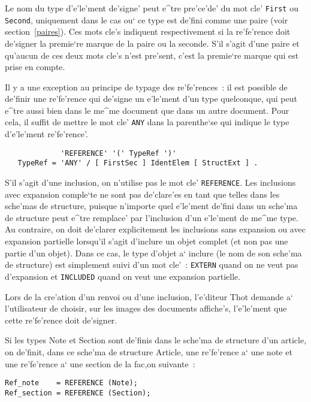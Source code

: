 {Le nom du type d'e'le'ment de'signe' peut e^tre pre'ce'de' du mot cle'
{\tt First} ou {\tt Second}, uniquement dans le cas ou` ce type est de'fini
comme une paire (voir section~\ref{paires}). Ces mots cle's indiquent
respectivement si la re'fe'rence doit de'signer la premie`re marque de la paire
ou la seconde. S'il s'agit d'une paire et qu'aucun de ces deux mots cle's
n'est pre'sent, c'est la premie`re marque qui est prise en compte.

Il y a une exception au principe de typage des re'fe'rences~: il est possible
de de'finir une re'fe'rence qui de'signe un e'le'ment d'un type quelconque,
qui peut e^tre aussi bien dans le me^me document que dans un autre document.
Pour cela, il suffit de mettre le mot cle' {\tt ANY} dans la parenthe`se
qui indique le type d'e'le'ment re'fe'rence'.

\begin{verbatim}
             'REFERENCE' '(' TypeRef ')'
   TypeRef = 'ANY' / [ FirstSec ] IdentElem [ StructExt ] .
\end{verbatim}

S'il s'agit d'une inclusion, on n'utilise pas le mot cle' {\tt REFERENCE}.
Les inclusions avec expansion comple`te ne sont pas de'clare'es en tant que telles
dans les sche'mas de structure, puisque n'importe quel e'le'ment de'fini
dans un sche'ma de structure peut e^tre remplace' par l'inclusion d'un
e'le'ment de me^me type. Au contraire, on doit de'clarer explicitement
les inclusions sans expansion ou avec expansion partielle lorsqu'il s'agit
d'inclure un objet complet
(et non pas une partie d'un objet). Dans ce cas, le type d'objet a` inclure
(le nom de son sche'ma de structure) est simplement suivi d'un mot cle'~:
{\tt EXTERN} quand on ne veut pas d'expansion et {\tt INCLUDED} quand on veut
une expansion partielle.

Lors de la cre'ation d'un renvoi ou d'une inclusion, l'e'diteur Thot
demande a` l'utilisateur de choisir, sur les images des documents affiche's,
l'e'le'ment que cette re'fe'rence doit de'signer.

\begin{example}
Si les types Note et Section sont de'finis dans le sche'ma de
structure d'un article, on de'finit, dans ce sche'ma de structure
Article, une re'fe'rence a` une note et une re'fe'rence a` une
section de la fac,on suivante~:

\begin{verbatim}
Ref_note    = REFERENCE (Note);
Ref_section = REFERENCE (Section);
\end{verbatim}


\end{example}}
